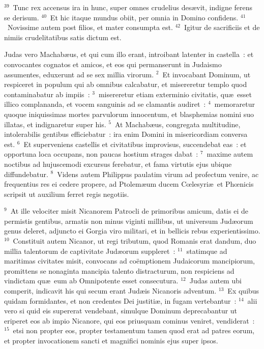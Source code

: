 ${}^{39}$~Tunc rex accensus ira in hunc, super omnes crudelius des\ae vit, indigne ferens se derisum.
${}^{40}$~Et hic itaque mundus obiit, per omnia in Domino confidens.
${}^{41}$~Novissime autem post filios, et mater consumpta est.
${}^{42}$~Igitur de sacrificiis et de nimiis crudelitatibus satis dictum est.

\bchapter
\lettrine[lines=3,image=true,loversize=0.05,lraise=-0.03]{J}{}udas vero Machab\ae us, et qui cum illo erant, introibant latenter in castella~: et convocantes cognatos et amicos, et eos qui permanserunt in Judaismo assumentes, eduxerunt ad se sex millia virorum.
${}^{2}$~Et invocabant Dominum, ut respiceret in populum qui ab omnibus calcabatur, et misereretur templo quod contaminabatur ab impiis~:
${}^{3}$~misereretur etiam exterminio civitatis, qu\ae\ esset illico complananda, et vocem sanguinis ad se clamantis audiret~:
${}^{4}$~memoraretur quoque iniquissimas mortes parvulorum innocentum, et blasphemias nomini suo illatas, et indignaretur super his.
${}^{5}$~At Machab\ae us, congregata multitudine, intolerabilis gentibus efficiebatur~: ira enim Domini in misericordiam conversa est.
${}^{6}$~Et superveniens castellis et civitatibus improvisus, succendebat eas~: et opportuna loca occupans, non paucas hostium strages dabat~:
${}^{7}$~maxime autem noctibus ad hujuscemodi excursus ferebatur, et fama virtutis ejus ubique diffundebatur.
${}^{8}$~Videns autem Philippus paulatim virum ad profectum venire, ac frequentius res ei cedere propere, ad Ptolem\ae um ducem Cœlesyri\ae\ et Phœnicis scripsit ut auxilium ferret regis negotiis.


${}^{9}$~At ille velociter misit Nicanorem Patrocli de primoribus amicum, datis ei de permistis gentibus, armatis non minus viginti millibus, ut universum Jud\ae orum genus deleret, adjuncto ei Gorgia viro militari, et in bellicis rebus experientissimo.
${}^{10}$~Constituit autem Nicanor, ut regi tributum, quod Romanis erat dandum, duo millia talentorum de captivitate Jud\ae orum suppleret~:
${}^{11}$~statimque ad maritimas civitates misit, convocans ad co\"emptionem Judaicorum mancipiorum, promittens se nonaginta mancipia talento distracturum, non respiciens ad vindictam qu\ae\ eum ab Omnipotente esset consecutura.
${}^{12}$~Judas autem ubi comperit, indicavit his qui secum erant Jud\ae is Nicanoris adventum.
${}^{13}$~Ex quibus quidam formidantes, et non credentes Dei justiti\ae , in fugam vertebantur~:
${}^{14}$~alii vero si quid eis supererat vendebant, simulque Dominum deprecabantur ut eriperet eos ab impio Nicanore, qui eos priusquam cominus veniret, vendiderat~:
${}^{15}$~etsi non propter eos, propter testamentum tamen quod erat ad patres eorum, et propter invocationem sancti et magnifici nominis ejus super ipsos.


